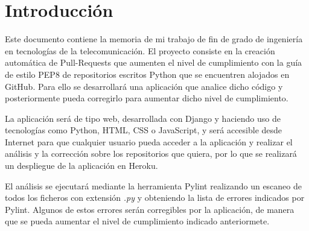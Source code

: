 \documentclass[a4paper, 12pt]{book}
\begin{document}

\tableofcontents 
\cleardoublepage
{} %
\listoffigures %
\cleardoublepage
{} %
\listoftables %



\cleardoublepage
\chapter{Introducción}
\label{chap:intro}
\label{sec:intro} %
Este documento contiene la memoria de mi trabajo de fin de grado de ingeniería en tecnologías de la telecomunicación.
El proyecto consiste en la creación automática de Pull-Requests que aumenten el nivel de cumplimiento con la guía de estilo PEP8 de repositorios escritos Python que se encuentren alojados en GitHub.
Para ello se desarrollará una aplicación que analice dicho código y posteriormente pueda corregirlo para aumentar dicho nivel de cumplimiento.

La aplicación será de tipo web, desarrollada con Django y haciendo uso de tecnologías como Python, HTML, CSS o JavaScript, y será accesible desde Internet para que cualquier usuario pueda acceder a la aplicación y realizar el análisis y la corrección sobre los repositorios que quiera, por lo que se realizará un despliegue de la aplicación en Heroku.

El análisis se ejecutará mediante la herramienta Pylint realizando un escaneo de todos los ficheros con extensión \textit{.py} y obteniendo la lista de errores indicados por Pylint.
Algunos de estos errores serán corregibles por la aplicación, de manera que se pueda aumentar el nivel de cumplimiento indicado anteriormete.
\end{document}

